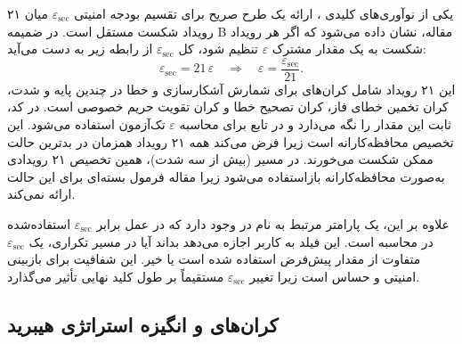 یکی از نوآوری‌های کلیدی ، ارائه یک طرح صریح برای تقسیم بودجه امنیتی $\varepsilon_{\text{sec}}$ میان ۲۱ رویداد شکست مستقل است. در ضمیمه B مقاله، نشان داده می‌شود که اگر هر رویداد شکست به یک مقدار مشترک $\varepsilon$ تنظیم شود، کل $\varepsilon_{\text{sec}}$ از رابطه زیر به دست می‌آید:
\begin{equation}
	\varepsilon_{\text{sec}} = 21\,\varepsilon \quad \Rightarrow \quad \varepsilon = \frac{\varepsilon_{\text{sec}}}{21}.
\end{equation}
این ۲۱ رویداد شامل کران‌های  برای شمارش آشکارسازی و خطا در چندین پایه و شدت، کران تخمین خطای فاز، کران تصحیح خطا و کران تقویت حریم خصوصی است. در کد، ثابت  این مقدار را نگه می‌دارد و در تابع  برای محاسبه $\varepsilon$ تک‌آزمون استفاده می‌شود. این تخصیص محافظه‌کارانه است زیرا فرض می‌کند همه ۲۱ رویداد همزمان در بدترین حالت ممکن شکست می‌خورند. در مسیر  (بیش از سه شدت)، همین تخصیص ۲۱ رویدادی به‌صورت محافظه‌کارانه بازاستفاده می‌شود زیرا مقاله فرمول بسته‌ای برای این حالت ارائه نمی‌کند.

علاوه بر این، یک پارامتر مرتبط به نام  در  وجود دارد که در عمل برابر $\varepsilon_{\text{sec}}$ استفاده‌شده در محاسبه است. این فیلد به کاربر اجازه می‌دهد بداند آیا در مسیر  تکراری، یک $\varepsilon_{\text{sec}}$ متفاوت از مقدار پیش‌فرض  استفاده شده است یا خیر. این شفافیت برای بازبینی امنیتی و  حساس است زیرا تغییر $\varepsilon_{\text{sec}}$ مستقیماً بر طول کلید نهایی تأثیر می‌گذارد.

\subsection{کران‌های  و انگیزه استراتژی هیبرید}

